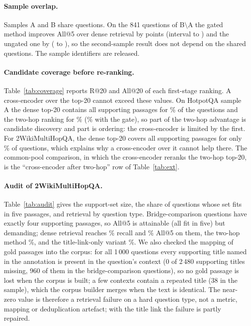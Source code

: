 \documentclass[a4paper,fleqn]{cas-sc}
\begin{document}
\paragraph{Sample overlap.}
Samples A and B share \nOverlapAB{} questions. On the 841 questions of B$\setminus$A the gated method improves All@5 over dense retrieval by \CtlVDHXGateD{} points (interval \CtlVDHXGateLo{} to \CtlVDHXGateHi{}) and the ungated one by \CtlVDHXTwoD{} (\CtlVDHXTwoLo{} to \CtlVDHXTwoHi{}), so the second-sample result does not depend on the shared questions. The sample identifiers are released.

\paragraph{Candidate coverage before re-ranking.}
Table~\ref{tab:coverage} reports R@20 and All@20 of each first-stage ranking. A cross-encoder over the top-20 cannot exceed these values. On HotpotQA sample A the dense top-20 contains all supporting passages for \CovHADenseAllTwenty\% of the questions and the two-hop ranking for \CovHATwoAllTwenty\% (\CovHAGateAllTwenty\% with the gate), so part of the two-hop advantage is candidate discovery and part is ordering: the cross-encoder is limited by the first. For 2WikiMultiHopQA, the dense top-20 covers all supporting passages for only \CovTWDenseAllTwenty\% of questions, which explains why a cross-encoder over it cannot help there. The common-pool comparison, in which the cross-encoder reranks the two-hop top-20, is the ``cross-encoder after two-hop'' row of Table~\ref{tab:ext}.

\paragraph{Audit of 2WikiMultiHopQA.}
Table~\ref{tab:audit} gives the support-set size, the share of questions whose set fits in five passages, and retrieval by question type. Bridge-comparison questions have exactly four supporting passages, so All@5 is attainable (all fit in five) but demanding; dense retrieval reaches \AudDenseBridgecomparisonRec\% recall and \AudDenseBridgecomparisonAll\% All@5 on them, the two-hop method \AudTwoBridgecomparisonAll\%, and the title-link-only variant \AudTitBridgecomparisonAll\%. We also checked the mapping of gold passages into the corpus: for all 1\,000 questions every supporting title named in the annotation is present in the question's context (0 of 2\,480 supporting titles missing, 960 of them in the bridge-comparison questions), so no gold passage is lost when the corpus is built; a few contexts contain a repeated title (38 in the sample), which the corpus builder merges when the text is identical. The near-zero value is therefore a retrieval failure on a hard question type, not a metric, mapping or deduplication artefact; with the title link the failure is partly repaired.
\end{document}
